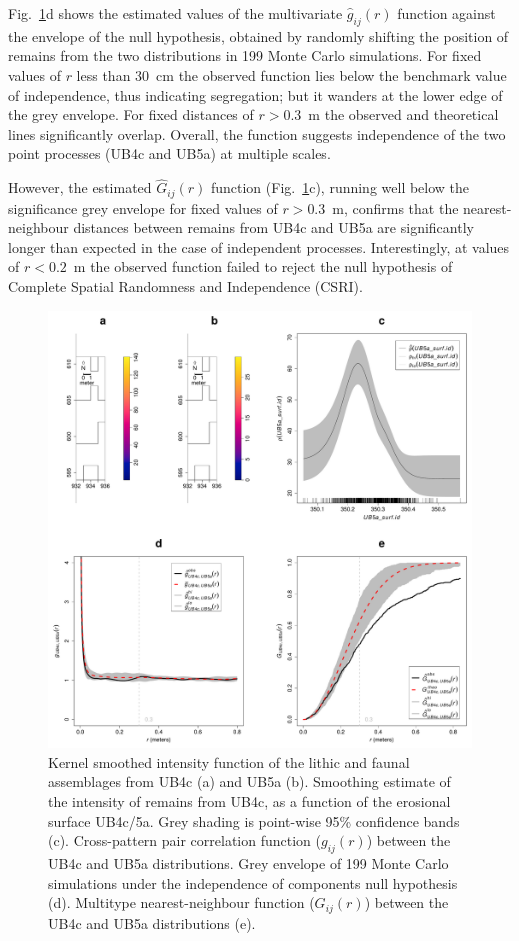 \documentclass[preprint,authoryear,times]{elsarticle} %
\begin{document}
Fig.~\ref{fig:12}d shows the estimated values of the multivariate $\hat{g}_{ij}(r)$ function against the envelope of the null hypothesis, obtained by randomly shifting the position of remains from the two distributions in 199 Monte Carlo simulations. For fixed values of $r$ less than 30~cm the observed function lies below the benchmark value of independence, thus indicating segregation; but it wanders at the lower edge of the grey envelope. For fixed distances of $r>0.3$~m the observed and theoretical lines significantly overlap. Overall, the function suggests independence of the two point processes (UB4c and UB5a) at multiple scales.

However, the estimated $\hat{G}_{ij}(r)$ function (Fig.~\ref{fig:12}c), running well below the significance grey envelope for fixed values of $r>0.3$~m, confirms that the nearest-neighbour distances between remains from UB4c and UB5a are significantly longer than expected in the case of independent processes. Interestingly, at values of $r<0.2$~m the observed function failed to reject the null hypothesis of Complete Spatial Randomness and Independence (CSRI).

\begin{figure}[]
  \centering
  \includegraphics[width=1\textwidth]{./artwork/Fig12.pdf}
  \caption{Kernel smoothed intensity function of the lithic and faunal assemblages from UB4c (a) and UB5a (b). Smoothing estimate of the intensity of remains from UB4c, as a function of the erosional surface UB4c/5a. Grey shading is point-wise 95\% confidence bands (c). Cross-pattern pair correlation function ($g_{ij}(r)$) between the UB4c and UB5a distributions. Grey envelope of 199 Monte Carlo simulations under the independence of components null hypothesis (d). Multitype nearest-neighbour function ($G_{ij}(r)$) between the UB4c and UB5a distributions (e).}
  \label{fig:12}
\end{figure}
\end{document}
